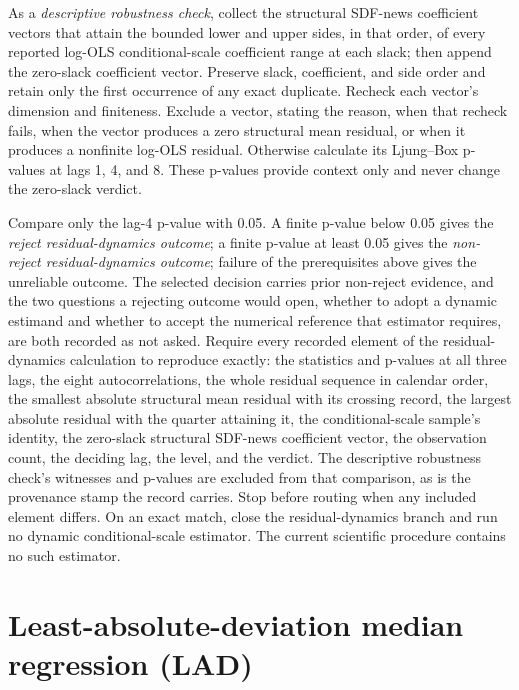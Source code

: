 \documentclass[11pt]{article}
\begin{document}
As a \emph{descriptive robustness check}, collect the structural SDF-news coefficient vectors that attain the
bounded lower and upper sides, in that order, of every reported log-OLS conditional-scale
coefficient range at each slack; then append the zero-slack coefficient vector. Preserve slack,
coefficient, and side order and retain only the first occurrence of any exact duplicate. Recheck
each vector's dimension and finiteness. Exclude a vector, stating the reason, when that recheck
fails, when the vector produces a zero structural mean residual, or when it produces a nonfinite
log-OLS residual. Otherwise calculate its Ljung--Box p-values at lags 1, 4, and 8. These p-values
provide context only and never change the zero-slack verdict.

Compare only the lag-4 p-value with 0.05. A finite p-value below 0.05 gives the \emph{reject
residual-dynamics outcome}; a finite p-value at least 0.05 gives the \emph{non-reject
residual-dynamics outcome}; failure of the prerequisites above gives the unreliable outcome. The
selected decision carries prior non-reject evidence, and the two questions a rejecting outcome would
open, whether to adopt a dynamic estimand and whether to accept the numerical reference that
estimator requires, are both recorded as not asked.
Require every recorded element of the residual-dynamics calculation to reproduce exactly: the
statistics and p-values at all three lags, the eight autocorrelations, the whole residual sequence in
calendar order, the smallest absolute structural mean residual with its crossing record, the largest
absolute residual with the quarter attaining it, the conditional-scale sample's identity, the
zero-slack structural SDF-news coefficient vector, the observation count, the deciding
lag, the level, and the verdict. The descriptive robustness check's witnesses and p-values are
excluded from that comparison, as is the provenance stamp the record carries. Stop
before routing when any included element differs. On an exact match, close the residual-dynamics branch and
run no dynamic conditional-scale estimator. The current scientific procedure contains no such estimator.

\section{Least-absolute-deviation median regression (LAD)}
\end{document}
